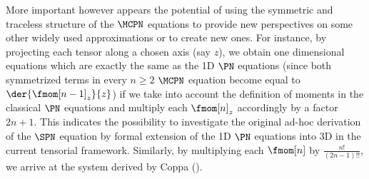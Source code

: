 More important however appears the potential of using the symmetric and traceless structure of the $\MCPN$ equations to
provide new perspectives on some other widely used approximations or to create new ones. For instance, by projecting
each tensor along a chosen axis (say $z$), we obtain one dimensional equations which are exactly the same as the 1D
$\PN$ equations (since both symmetrized terms in every $n \geq 2$ $\MCPN$ equation become equal to
$\der{\fmom[n-1]_z}{z}$) if we take into account the definition of moments in the classical $\PN$ equations and multiply
each $\fmom[n]_z$ accordingly by a factor ${2n+1}$. This indicates the possibility to investigate the original ad-hoc
derivation of the $\SPN$ equation by formal extension of the 1D $\PN$ equations into 3D in the current tensorial
framework. Similarly, by multiplying each $\fmom[n]$ by $\frac{n!}{(2n-1)!!}$, we arrive at the system derived by Coppa
(\cite{Coppa3}).

